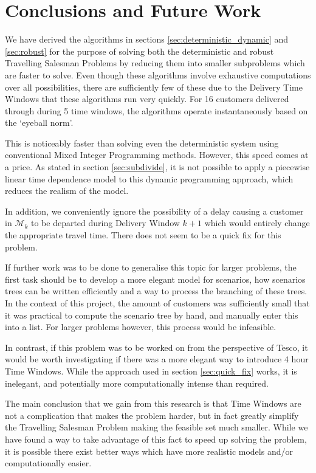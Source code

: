 \section{Conclusions and Future Work}
We have derived the algorithms in sections \ref{sec:deterministic_dynamic} and
\ref{sec:robust} for the purpose of solving both the deterministic and robust Travelling Salesman Problems by reducing them into smaller subproblems which are faster to solve. Even though these algorithms involve exhaustive computations over all possibilities, there are sufficiently few of these due to the Delivery Time Windows that these algorithms run very quickly. For 16 customers delivered through during 5 time windows, the algorithms operate instantaneously based on the `eyeball norm'.

This is noticeably faster than solving even the deterministic system using conventional Mixed Integer Programming methods. However, this speed comes at a price. As stated in section \ref{sec:subdivide}, it is not possible to apply a piecewise linear time dependence model to this dynamic programming approach, which reduces the realism of the model. 

In addition, we conveniently ignore the possibility of a delay causing a customer in $\mathcal{M}_k$ to be departed during Delivery Window $k+1$ which would entirely change the appropriate travel time. There does not seem to be a quick fix for this problem.

If further work was to be done to generalise this topic for larger problems, the first task should be to develop a more elegant model for scenarios, how scenarios trees can be written efficiently and a way to process the branching of these trees. In the context of this project, the amount of customers was sufficiently small that it was practical to compute the scenario tree by hand, and manually enter this into a list. For larger problems however, this process would be infeasible.

In contrast, if this problem was to be worked on from the perspective of Tesco, it would be worth investigating if there was a more elegant way to introduce 4 hour Time Windows. While the approach used in section \ref{sec:quick_fix} works, it is inelegant, and potentially more computationally intense than required.

The main conclusion that we gain from this research is that Time Windows are not a complication that makes the problem harder, but in fact greatly simplify the Travelling Salesman Problem making the feasible set much smaller. While we have found a way to take advantage of this fact to speed up solving the problem, it is possible there exist better ways which have more realistic models and/or computationally easier.




